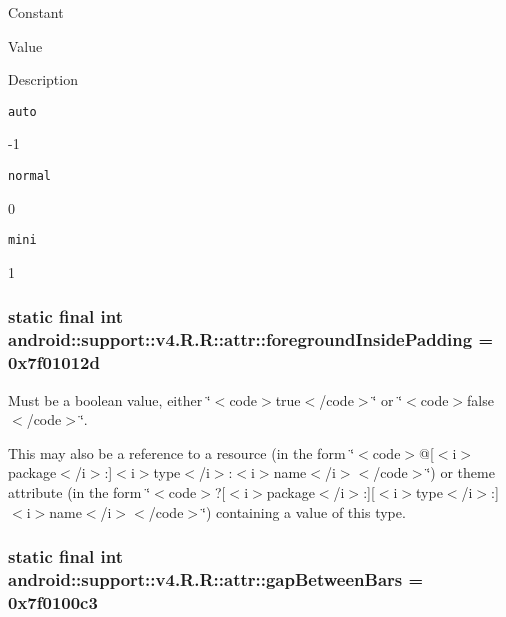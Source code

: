 Constant

Value

Description 

{\tt auto}

-1

{\tt normal}

0

{\tt mini}

1\hypertarget{classandroid_1_1support_1_1v4_1_1_r_1_1attr_2829eea29c8d783a096aa6c738634060}{
\subsubsection[{foregroundInsidePadding}]{\setlength{\rightskip}{0pt plus 5cm}static final int android::support::v4.R.R::attr::foregroundInsidePadding = 0x7f01012d}}
\label{classandroid_1_1support_1_1v4_1_1_r_1_1attr_2829eea29c8d783a096aa6c738634060}


Must be a boolean value, either \char`\"{}$<$code$>$true$<$/code$>$\char`\"{} or \char`\"{}$<$code$>$false$<$/code$>$\char`\"{}. 

This may also be a reference to a resource (in the form \char`\"{}$<$code$>$@\mbox{[}$<$i$>$package$<$/i$>$:\mbox{]}$<$i$>$type$<$/i$>$:$<$i$>$name$<$/i$>$$<$/code$>$\char`\"{}) or theme attribute (in the form \char`\"{}$<$code$>$?\mbox{[}$<$i$>$package$<$/i$>$:\mbox{]}\mbox{[}$<$i$>$type$<$/i$>$:\mbox{]}$<$i$>$name$<$/i$>$$<$/code$>$\char`\"{}) containing a value of this type. \hypertarget{classandroid_1_1support_1_1v4_1_1_r_1_1attr_92ae63e031e3bc6652f36bcdbef16a2a}{
\subsubsection[{gapBetweenBars}]{\setlength{\rightskip}{0pt plus 5cm}static final int android::support::v4.R.R::attr::gapBetweenBars = 0x7f0100c3}}
\label{classandroid_1_1support_1_1v4_1_1_r_1_1attr_92ae63e031e3bc6652f36bcdbef16a2a}


